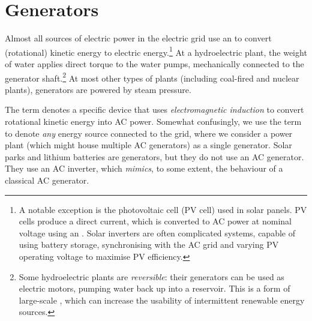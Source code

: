 \documentclass[main.tex]{subfiles}
\begin{document}
\section{Generators}
Almost all sources of electric power in the electric grid use an  to convert (rotational) kinetic energy to electric energy.\footnote{A notable exception is the photovoltaic cell (PV cell) used in solar panels. PV cells produce a direct current, which is converted to AC power at nominal voltage using an . Solar inverters are often complicated systems, capable of using battery storage, synchronising with the AC grid and varying PV operating voltage to maximise PV efficiency.} 
At a hydroelectric plant, the weight of water applies direct torque to the water pumps, mechanically connected to the generator shaft.\footnote{Some hydroelectric plants are \emph{reversible}: their generators can be used as electric motors, pumping water back up into a reservoir. This is a form of large-scale , which can increase the usability of intermittent renewable energy sources.}
At most other types of plants (including coal-fired and nuclear plants), generators are powered by steam pressure. 

The term  denotes a specific device that uses \emph{electromagnetic induction} to convert rotational kinetic energy into AC power. Somewhat confusingly, we use the term  to denote \emph{any} energy source connected to the grid, where we consider a power plant (which might house multiple AC generators) as a single generator. Solar parks and lithium batteries are generators, but they do not use an AC generator. They use an AC inverter, which \emph{mimics}, to some extent, the behaviour of a classical AC generator.

 
\end{document}
